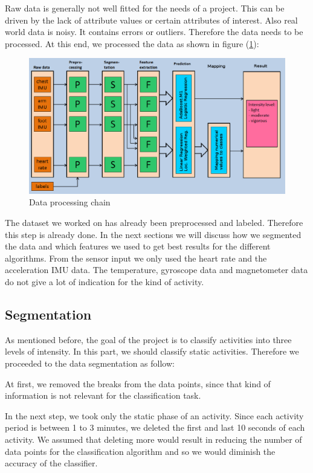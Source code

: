 \documentclass[12pt, a4paper, onecolumn, oneside, parskip=half]{scrartcl}
\begin{document}
Raw data is generally not well fitted for the needs of a project.  This can be driven by the lack of attribute values or certain attributes of interest. Also real world data is noisy. It contains errors or outliers.  Therefore the data needs to be processed. At this end, we processed the data as shown in figure (\ref{fig:classifier-pipeline}):

\begin{figure}[H]
  \centering
  \includegraphics[width=160mm]{pictures/Data_process_chain.png}
  \caption{Data processing chain \label{fig:classifier-pipeline}}
\end{figure}

 
The dataset we worked on has already been preprocessed and labeled. Therefore this step is already done. In the next sections we will discuss how we segmented the data and which features we used to get best results for the different algorithms. 
From the sensor input we only used the heart rate and the acceleration IMU data. The temperature, gyroscope data and magnetometer data do not give a lot of indication for the kind of activity.

\subsection{Segmentation}
As mentioned before, the goal of the project is to classify activities into three levels of intensity. In this part, we should classify static activities. Therefore we proceeded to the data segmentation as follow:

At first, we removed the breaks from the data points, since that kind of information is not relevant for the classification task.

In the next step, we took only the static phase of an activity. Since each activity period is between 1 to 3 minutes, we deleted the first and last 10 seconds of each activity. We assumed that deleting more would result in reducing the number of data points for the classification algorithm and so we would diminish the accuracy of the classifier.
\end{document}
